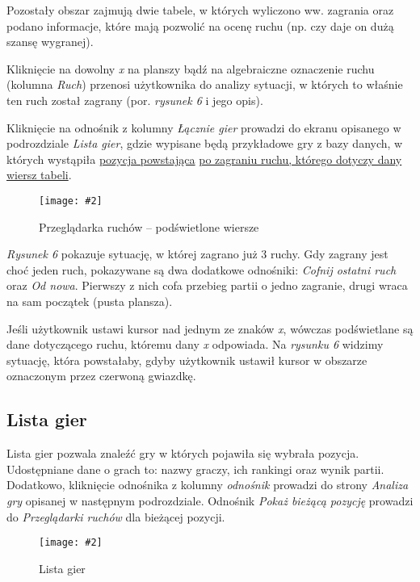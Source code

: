 \documentclass[10pt,leqno]{article}
\newcommand{\myimage}[3]{
  \begin{figure}[h!]
    \centering
      \texttt{[image: \#2]}
  \caption{#3}
  \end{figure}
}
\begin{document}
\vspace{0.5em}

\noindent Pozostały obszar zajmują dwie tabele, w których wyliczono ww. zagrania oraz podano informacje, które mają pozwolić na ocenę
ruchu (np. czy daje on dużą szansę wygranej).

\vspace{0.5em}

\noindent Kliknięcie na dowolny \emph{x} na planszy bądź na algebraiczne oznaczenie ruchu (kolumna \emph{Ruch}) przenosi użytkownika do
analizy sytuacji, w których to właśnie ten ruch został zagrany (por. \emph{rysunek 6} i jego opis).

\vspace{0.5em}

\noindent Kliknięcie na odnośnik z kolumny \emph{Łącznie gier} prowadzi do ekranu opisanego w podrozdziale \emph{Lista gier}, 
gdzie wypisane będą przykładowe gry z bazy danych, w których wystąpiła \underline{pozycja powstająca} 
\underline{po zagraniu ruchu, którego dotyczy dany wiersz tabeli}.

\myimage{0.47}{moveBrowserMoveOver.png}{Przeglądarka ruchów -- podświetlone wiersze}

\emph{Rysunek 6} pokazuje sytuację, w której zagrano już 3 ruchy. Gdy zagrany jest choć jeden ruch, pokazywane są dwa dodatkowe odnośniki:
\emph{Cofnij ostatni ruch} oraz \emph{Od nowa}. Pierwszy z nich cofa przebieg partii o jedno zagranie, drugi wraca na sam początek (pusta plansza).

Jeśli użytkownik ustawi kursor nad jednym ze znaków \emph{x}, wówczas podświetlane są dane dotyczącego ruchu, któremu dany \emph{x} odpowiada.
Na \emph{rysunku 6} widzimy sytuację, która powstałaby, gdyby użytkownik ustawił kursor w obszarze oznaczonym przez czerwoną gwiazdkę.

\newpage

\subsection{Lista gier}
Lista gier pozwala znaleźć gry w których pojawiła się wybrała pozycja. Udostępniane dane o grach to: nazwy graczy, ich rankingi oraz wynik partii.
Dodatkowo, kliknięcie odnośnika z kolumny \emph{odnośnik} prowadzi do strony \emph{Analiza gry} opisanej w następnym podrozdziale. Odnośnik 
\emph{Pokaż bieżącą pozycję} prowadzi do \emph{Przeglądarki ruchów} dla bieżącej pozycji.

\myimage{0.47}{gameList.png}{Lista gier}
\end{document}
